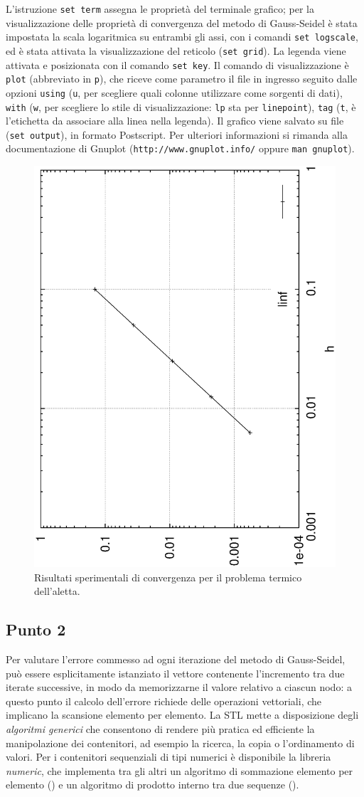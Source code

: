 L'istruzione \texttt{set term} assegna le propriet\`a del terminale
grafico; per la visualizzazione delle propriet\`a di convergenza del
metodo di Gauss-Seidel \`e stata impostata la scala logaritmica su
entrambi gli assi, con i comandi \texttt{set logscale}, ed \`e stata
attivata la visualizzazione del reticolo (\texttt{set grid}). La
legenda viene attivata e posizionata con il comando \texttt{set
  key}. Il comando di visualizzazione \`e \texttt{plot} (abbreviato in
\texttt{p}), che riceve come parametro il file in ingresso seguito
dalle opzioni \texttt{using} (\texttt{u}, per scegliere quali colonne
utilizzare come sorgenti di dati), \texttt{with} (\texttt{w}, per
scegliere lo stile di visualizzazione: \texttt{lp} sta per
\texttt{linepoint}), \texttt{tag} (\texttt{t}, \`e l'etichetta da
associare alla linea nella legenda). Il grafico viene salvato su file
(\texttt{set output}), in formato Postscript. Per ulteriori
informazioni si rimanda alla documentazione di Gnuplot
(\texttt{http://www.gnuplot.info/} oppure \texttt{man gnuplot}).
%
\begin{figure}
\begin{center}
\includegraphics[height=0.45\textwidth,angle=-90]{./figures/eps/fin.convergence.eps}
\caption{Risultati sperimentali di convergenza per il problema termico
dell'aletta.}
\label{fig:fin:conv}
\end{center}
\end{figure}

\subsection*{Punto 2}

Per valutare l'errore commesso ad ogni iterazione del metodo di
Gauss-Seidel, pu\`o essere esplicitamente istanziato il vettore
contenente l'incremento tra due iterate successive, in modo da
memorizzarne il valore relativo a ciascun nodo: a questo punto il calcolo
dell'errore richiede delle operazioni vettoriali, che implicano la
scansione elemento per elemento. La STL mette a disposizione degli
\emph{algoritmi generici} che consentono di rendere pi\`u pratica ed
efficiente la manipolazione dei contenitori, ad esempio la ricerca, la
copia o l'ordinamento di valori. Per i contenitori sequenziali di tipi
numerici \`e disponibile la libreria \emph{numeric}, che implementa
tra gli altri un algoritmo di sommazione elemento per elemento
() e un algoritmo di prodotto interno tra due
sequenze ().

